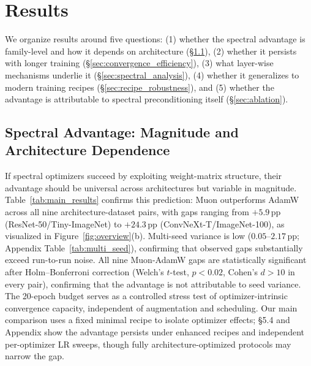 \section{Results}
\label{sec:results}

We organize results around five questions: (1) whether the spectral advantage is family-level and how it depends on architecture (\S\ref{sec:main_results}), (2) whether it persists with longer training (\S\ref{sec:convergence_efficiency}), (3) what layer-wise mechanisms underlie it (\S\ref{sec:spectral_analysis}), (4) whether it generalizes to modern training recipes (\S\ref{sec:recipe_robustness}), and (5) whether the advantage is attributable to spectral preconditioning itself (\S\ref{sec:ablation}).

\subsection{Spectral Advantage: Magnitude and Architecture Dependence}
\label{sec:main_results}
\label{sec:gap_magnitude}

If spectral optimizers succeed by exploiting weight-matrix structure, their advantage should be universal across architectures but variable in magnitude.
Table~\ref{tab:main_results} confirms this prediction: Muon outperforms AdamW across all nine architecture-dataset pairs, with gaps ranging from $+5.9$\,pp (ResNet-50/Tiny-ImageNet) to $+24.3$\,pp (ConvNeXt-T/ImageNet-100), as visualized in Figure~\ref{fig:overview}(b).
Multi-seed variance is low ($0.05$--$2.17$\,pp; Appendix Table~\ref{tab:multi_seed}), confirming that observed gaps substantially exceed run-to-run noise.
All nine Muon-AdamW gaps are statistically significant after Holm--Bonferroni correction (Welch's $t$-test, $p < 0.02$, Cohen's $d > 10$ in every pair), confirming that the advantage is not attributable to seed variance.
The 20-epoch budget serves as a controlled stress test of optimizer-intrinsic convergence capacity, independent of augmentation and scheduling.
Our main comparison uses a fixed minimal recipe to isolate optimizer effects; \S5.4 and Appendix show the advantage persists under enhanced recipes and independent per-optimizer LR sweeps, though fully architecture-optimized protocols may narrow the gap.

